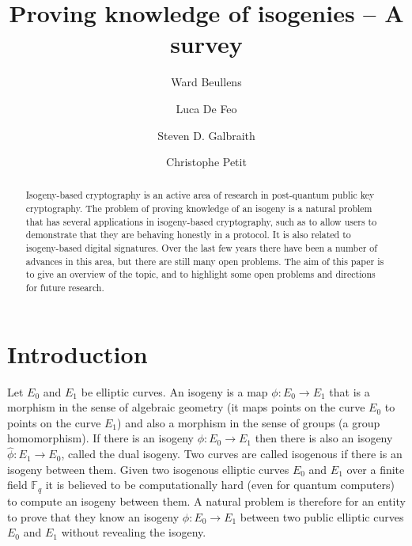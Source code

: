 \documentclass{llncs}
\newcommand{\F}{\ensuremath{\mathbb{F}}}
\begin{document}
\pagestyle{plain}

\title{Proving knowledge of isogenies -- A survey}


\author{Ward Beullens \and Luca De Feo \and Steven D. Galbraith \and Christophe Petit}


\maketitle


\begin{abstract}
Isogeny-based cryptography is an active area of research in post-quantum public key cryptography.
The problem of proving knowledge of an isogeny is a natural problem that has several applications in isogeny-based cryptography, such as to allow users to demonstrate that they are behaving honestly in a protocol.
It is also related to isogeny-based digital signatures.
Over the last few years there have been a number of advances in this area, but there are still many open problems.
The aim of this paper is to give an overview of the topic, and to highlight some open problems and directions for future research.
\end{abstract}



\section{Introduction}\label{sec1}


Let $E_0$ and $E_1$ be elliptic curves.
An isogeny is a map $\phi : E_0 \to E_1$ that is a morphism in the sense of algebraic geometry (it maps points on the curve $E_0$ to points on the curve $E_1$) and also a morphism in the sense of groups (a group homomorphism).
If there is an isogeny $\phi : E_0 \to E_1$ then there is also an isogeny $\hat{\phi} : E_1 \to E_0$, called the dual isogeny.
Two curves are called isogenous if there is an isogeny between them.
Given two isogenous elliptic curves $E_0$ and $E_1$ over a finite field $\F_q$ it is believed to be computationally hard (even for quantum computers) to compute an isogeny between them.
A natural problem is therefore for an entity to prove that they know an isogeny $\phi : E_0 \to E_1$ between two public elliptic curves $E_0$ and $E_1$ without revealing the isogeny.
\end{document}
